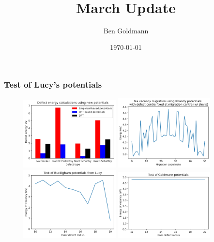 \documentclass{beamer}
\title{March Update}
\author{Ben Goldmann}
\date{\today}
\begin{document}
\begin{frame}
\titlepage
\end{frame}

\begin{frame}
\frametitle{Test of Lucy's potentials}

\begin{figure}
\includegraphics[width=0.45\textwidth]{lucy_defects.jpg}
\includegraphics[width=0.45\textwidth]{lucy_migration.jpg}
\includegraphics[width=0.45\textwidth]{lucy_test.jpg}
\includegraphics[width=0.45\textwidth]{khandy_test_scaled.jpg}
\end{figure}

\end{frame}
\end{document}
